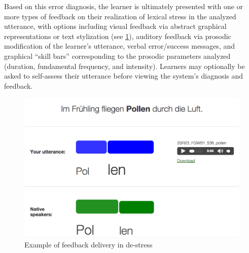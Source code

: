 \documentclass[a4paper]{article}
\begin{document}
 Based on this error diagnosis, the learner is ultimately presented with one or more types of feedback on their realization of lexical stress in the analyzed utterance, with options including visual feedback via abstract graphical representations or text stylization (see \cref{fig:interface:student}), auditory feedback via prosodic modification of the learner's utterance, verbal error/success messages, and graphical ``skill bars'' corresponding to the prosodic parameters analyzed (duration, fundamental frequency, and intensity).  Learners may optionally be asked to self-assess their utterance before viewing the system's diagnosis and feedback.

	\begin{figure}[!h]
		\centering
		\includegraphics[width=.9\columnwidth]{../../img/screenshots/graphicalFB-weka-plusTextStyle}
		\caption{Example of feedback delivery in de-stress}
		\label{fig:interface:student}
	\end{figure}
\end{document}
